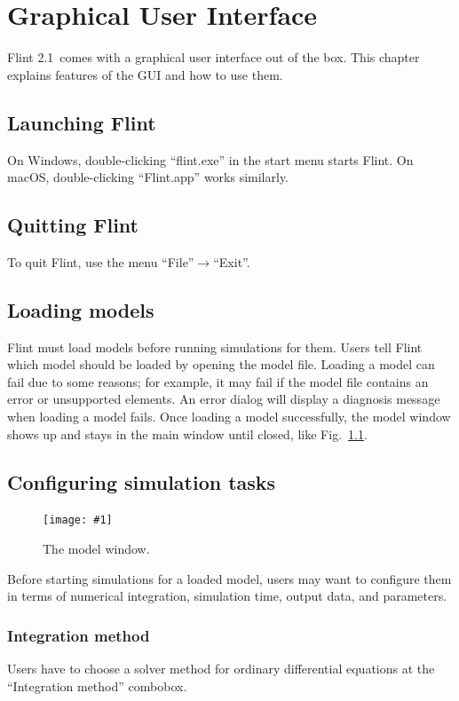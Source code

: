 \documentclass[a4paper,10pt]{report}
\def\FlintVersion{2.1}
\def\Flint{Flint \FlintVersion}
\newcommand\FigureOfImage[2]{\begin{figure}[h]
  \centering
  \texttt{[image: \#1]}
  \caption{#2}\label{fig:#1}
\end{figure}}
\begin{document}

\chapter{Graphical User Interface}
\Flint\ comes with a graphical user interface out of the box. This chapter
explains features of the GUI and how to use them.

\section{Launching Flint}
On Windows, double-clicking ``flint.exe'' in the start menu starts Flint.
On macOS, double-clicking ``Flint.app'' works similarly.

\section{Quitting Flint}
To quit Flint, use the menu ``File''$\rightarrow$``Exit''.

\section{Loading models}
Flint must load models before running simulations for them.
Users tell Flint which model should be loaded by opening the model file.
Loading a model can fail due to some reasons; for example, it may fail if
the model file contains an error or unsupported elements.
An error dialog will display a diagnosis message when loading a model fails.
Once loading a model successfully, the model window shows up and stays
in the main window until closed, like Fig.~\ref{fig:lr}.

\section{Configuring simulation tasks}
\FigureOfImage{lr}{The model window.}
Before starting simulations for a loaded model, users may want to configure them
in terms of numerical integration, simulation time, output data, and parameters.

\subsection{Integration method}
Users have to choose a solver method for ordinary differential equations at the
``Integration method'' combobox.
\end{document}
